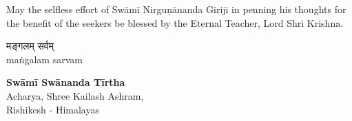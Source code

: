 {May the selfless effort of Swāmī  Nirguṇānanda Giriji in penning his thoughts for the benefit of the seekers be blessed by the Eternal Teacher, Lord Shri Krishna.\\
}
\begin{center}
{\devfont मङ्गलम्  सर्वम्}\\
{\footnotesize maṅgalam sarvam}
\end{center}
{\large\arialUC \textbf{Swāmī Swānanda Tīrtha\\}}
{\footnotesize\arialUC Acharya, Shree Kailash Ashram, \\Rishikesh - Himalayas}
\newpage
